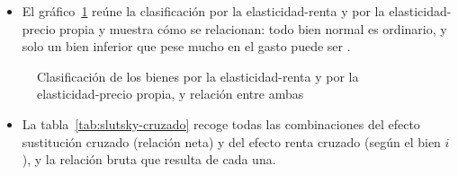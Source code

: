 \documentclass[11pt]{article}
\begin{document}
\begin{itemize}
\item El gráfico~\ref{fig:elasticidades-renta-precio} reúne la clasificación por la elasticidad-renta y por la elasticidad-precio propia y muestra cómo se relacionan: todo bien normal es ordinario, y solo un bien inferior que pese mucho en el gasto puede ser .
\end{itemize}

\begin{figure}[H]
\centering
\caption{Clasificación de los bienes por la elasticidad-renta y por la elasticidad-precio propia, y relación entre ambas}\label{fig:elasticidades-renta-precio}
\end{figure}

\begin{itemize}
\item La tabla~\ref{tab:slutsky-cruzado} recoge todas las combinaciones del efecto sustitución cruzado (relación neta) y del efecto renta cruzado (según el bien $i$), y la relación bruta que resulta de cada una.
\end{itemize}
\end{document}
